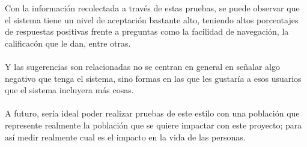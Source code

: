Con la informaci\'on recolectada a trav\'es de estas pruebas, se puede observar que el sistema tiene un nivel de aceptaci\'on bastante alto,  teniendo altos porcentajes de respuestas positivas frente a preguntas como la facilidad de navegaci\'on, la calificac\'on que le dan, entre otras.
\\
\\
Y las sugerencias son relacionadas no se centran en general en se\~nalar algo negativo que tenga el sistema, sino formas en las que les gustar\'ia a esos usuarios que el sistema incluyera m\'as cosas.
\\
\\
A futuro, ser\'ia ideal poder realizar pruebas de este estilo con una poblaci\'on que represente realmente la poblaci\'on que se quiere impactar con este proyecto; para as\'i medir realmente cual es el impacto en la vida de las personas.